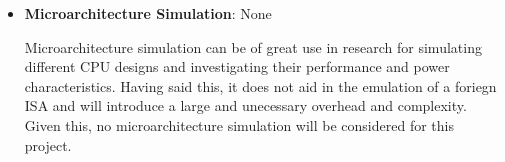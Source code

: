 \begin{itemize}
    \item \textbf{Microarchitecture Simulation}: None
    
    Microarchitecture simulation can be of great use in research for simulating different CPU designs and investigating their performance and power characteristics. Having said this, it does not aid in the emulation of a foriegn ISA and will introduce a large and unecessary overhead and complexity. Given this, no microarchitecture simulation will be considered for this project.
\end{itemize}